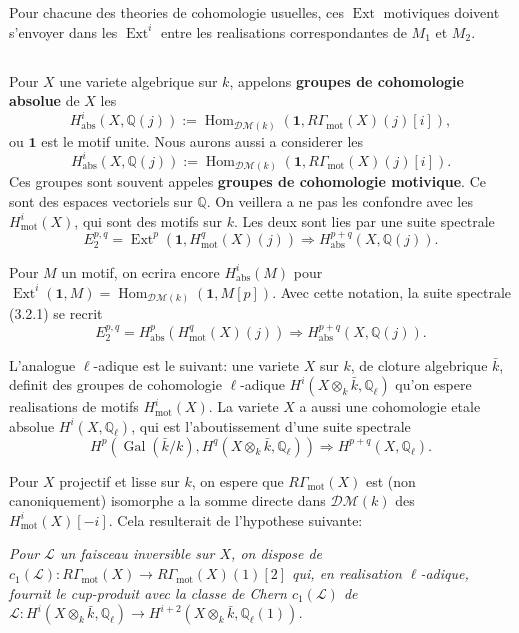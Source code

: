 \documentclass[11pt,a4paper]{article}
\theoremstyle{plain}
\theoremstyle{definition}
\DeclareMathOperator{\Ext}{Ext}
\DeclareMathOperator{\Hom}{Hom}
\DeclareMathOperator{\Gal}{Gal}
\newcommand{\Q}{\mathbb{Q}}
\DeclareMathOperator{\mot}{mot}
\newcommand{\abs}{\mathrm{abs}}
\begin{document}
Pour chacune des theories de cohomologie usuelles, ces $\Ext$ motiviques doivent s'envoyer dans les $\Ext^i$ entre les realisations correspondantes de $M_1$ et $M_2$.

\subsection{}

Pour $X$ une variete algebrique sur $k$, appelons \textbf{groupes de cohomologie absolue} de $X$ les
$$
H^i_{\abs}(X, \Q(j)) := \Hom_{\mathscr{D}\mathcal{M}(k)}(\mathbf{1}, R\Gamma_{\mot}(X)(j)[i]),
$$
ou $\mathbf{1}$ est le motif unite. Nous aurons aussi a considerer les
$$
H^i_{\abs}(X, \Q(j)) := \Hom_{\mathscr{D}\mathcal{M}(k)}(\mathbf{1}, R\Gamma_{\mot}(X)(j)[i]).
$$
Ces groupes sont souvent appeles \textbf{groupes de cohomologie motivique}. Ce sont des espaces vectoriels sur $\Q$. On veillera a ne pas les confondre avec les $H^i_{\mot}(X)$, qui sont des motifs sur $k$. Les deux sont lies par une suite spectrale
\begin{equation}
\tag{3.2.1}
E_2^{p,q} = \Ext^p(\mathbf{1}, H^q_{\mot}(X)(j)) \Rightarrow H^{p+q}_{\abs}(X, \Q(j)).
\end{equation}

Pour $M$ un motif, on ecrira encore $H^i_{\abs}(M)$ pour $\Ext^i(\mathbf{1}, M) = \Hom_{\mathscr{D}\mathcal{M}(k)}(\mathbf{1}, M[p])$. Avec cette notation, la suite spectrale (3.2.1) se recrit
\begin{equation}
\tag{3.2.2}
E_2^{p,q} = H^p_{\abs}(H^q_{\mot}(X)(j)) \Rightarrow H^{p+q}_{\abs}(X, \Q(j)).
\end{equation}

L'analogue $\ell$-adique est le suivant: une variete $X$ sur $k$, de cloture algebrique $\bar{k}$, definit des groupes de cohomologie $\ell$-adique $H^i(X \otimes_k \bar{k}, \Q_\ell)$ qu'on espere realisations de motifs $H^i_{\mot}(X)$. La variete $X$ a aussi une cohomologie etale absolue $H^i(X, \Q_\ell)$, qui est l'aboutissement d'une suite spectrale
$$
H^p(\Gal(\bar{k}/k), H^q(X \otimes_k \bar{k}, \Q_\ell)) \Rightarrow H^{p+q}(X, \Q_\ell).
$$

Pour $X$ projectif et lisse sur $k$, on espere que $R\Gamma_{\mot}(X)$ est (non canoniquement) isomorphe a la somme directe dans $\mathscr{D}\mathcal{M}(k)$ des $H^i_{\mot}(X)[-i]$. Cela resulterait de l'hypothese suivante:

\textit{Pour $\mathscr{L}$ un faisceau inversible sur $X$, on dispose de $c_1(\mathscr{L}): R\Gamma_{\mot}(X) \to R\Gamma_{\mot}(X)(1)[2]$ qui, en realisation $\ell$-adique, fournit le cup-produit avec la classe de Chern $c_1(\mathscr{L})$ de $\mathscr{L}: H^i(X \otimes_k \bar{k}, \Q_\ell) \to H^{i+2}(X \otimes_k \bar{k}, \Q_\ell(1))$.}
\end{document}
